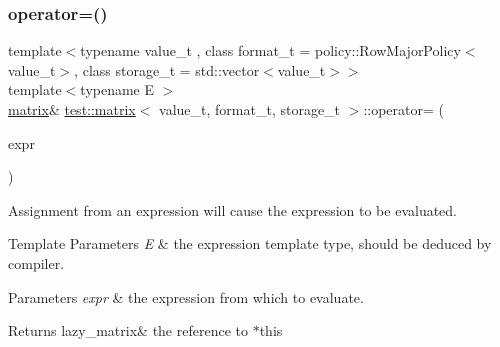 \subsubsection{\texorpdfstring{operator=()}{operator=()}\hspace{0.1cm}{\footnotesize\ttfamily [1/2]}}
{\footnotesize\ttfamily template$<$typename value\+\_\+t , class format\+\_\+t  = policy\+::\+Row\+Major\+Policy$<$value\+\_\+t$>$, class storage\+\_\+t  = std\+::vector$<$value\+\_\+t$>$$>$ \\
template$<$typename E $>$ \\
\mbox{\hyperlink{classtest_1_1matrix}{matrix}}\& \mbox{\hyperlink{classtest_1_1matrix}{test\+::matrix}}$<$ value\+\_\+t, format\+\_\+t, storage\+\_\+t $>$\+::operator= (\begin{DoxyParamCaption}\item[{\mbox{\hyperlink{classtest_1_1expression}{expression}}$<$ E $>$ const \&}]{expr }\end{DoxyParamCaption})\hspace{0.3cm}{\ttfamily [inline]}}



Assignment from an expression will cause the expression to be evaluated. 


\begin{DoxyTemplParams}{Template Parameters}
{\em E} & the expression template type, should be deduced by compiler. \\
\hline
\end{DoxyTemplParams}

\begin{DoxyParams}{Parameters}
{\em expr} & the expression from which to evaluate. \\
\hline
\end{DoxyParams}
\begin{DoxyReturn}{Returns}
lazy\+\_\+matrix\& the reference to $\ast$this 
\end{DoxyReturn}
\mbox{\label{classtest_1_1matrix_aa7bbe72d7ffc9d74738f55f490f0f9ea}} 
